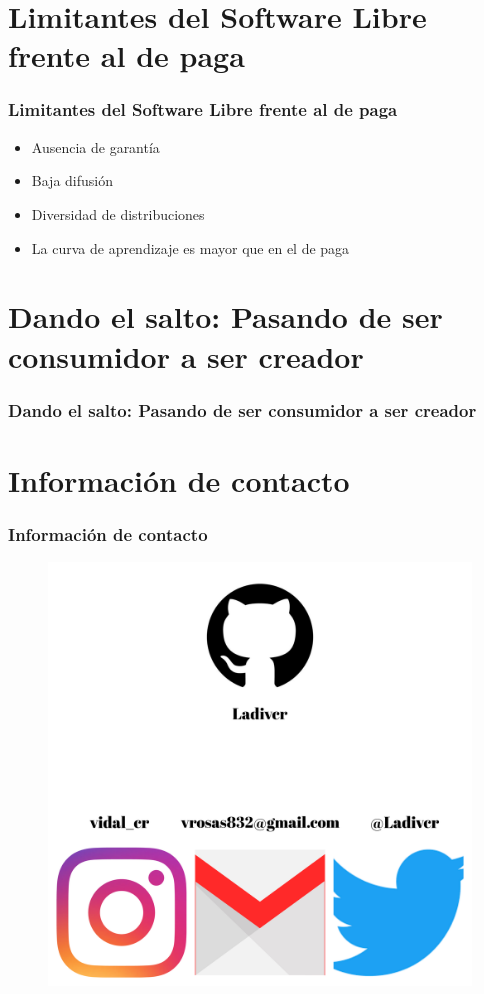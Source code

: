 \documentclass{beamer}
\begin{document}
    \section{Limitantes del Software Libre frente al de paga}
    \begin{frame}
     \frametitle{Limitantes del Software Libre frente al de paga}
     \begin{itemize}
        \item Ausencia de garantía
        \item Baja difusión
        \item Diversidad de distribuciones
        \item La curva de aprendizaje es mayor que en el de paga
     \end{itemize}

    \end{frame}

    \section{Dando el salto: Pasando de ser consumidor a ser creador}
    \begin{frame}
     \frametitle{Dando el salto: Pasando de ser consumidor a ser creador}
    \end{frame}
    
    \section{Información de contacto}
    \begin{frame}
    \frametitle{Información de contacto}
     \begin{figure}[h]
     \includegraphics[scale=0.2]{redes.jpg}
      \centering
     \end{figure}
    \end{frame}
    
\end{document}
